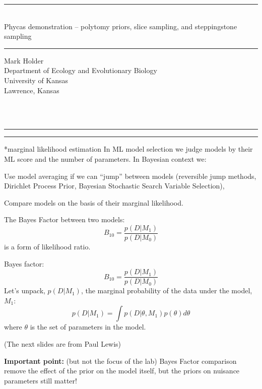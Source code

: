 \documentclass[landscape]{foils}
\newcommand{\section}{\secdef \newsection\newsection}
\newcommand{\newsection}[1]{%
{
	\par\flushleft\large\sf\bfseries \vskip -2cm #1\\\rule[0.7\baselineskip]{\textwidth}{0.5mm}\par}}
\newcommand{\myBackground}{\begin{picture}(0,0)(0,0)  \put(-40,-70){\makebox(0,0)[l]{\texttt{[image: images/baby\_blue.jpg]}}} \end{picture}}
\newcommand{\myFooter}{}
\newcommand{\myNewSlide}{\newpage\myFooter} %
\renewcommand{\Pr}{p}
\begin{document}
\pagecolor{white}
\MyLogo{}
\unitlength=1mm


\begin{flushleft}
\begin{center}
\rule{\textwidth}{2mm}\\
{\LARGE Phycas demonstration -- polytomy priors, slice sampling, and steppingstone sampling \\}
\vskip 2mm
\rule[2mm]{\textwidth}{2mm}
\end{center}
\vskip 2cm
Mark Holder\\
Department of Ecology and Evolutionary Biology\\
University of Kansas\\
Lawrence, Kansas

\end{flushleft}


\myNewSlide
\section*{marginal likelihood estimation}
In ML model selection we judge models by their ML score and the number of parameters.
In Bayesian context we:
\begin{compactitem}
	\item Use model averaging if we can ``jump'' between models (reversible jump methods, Dirichlet Process Prior, Bayesian Stochastic Search Variable Selection),
	\item Compare models on the basis of their marginal likelihood.
\end{compactitem}

The Bayes Factor between two models:
\[B_{10} = \frac{\Pr(D|M_1)}{\Pr(D|M_0)}\]
 is a form of likelihood ratio.\\
\myNewSlide

\myNewSlide
Bayes factor:
\[B_{10} = \frac{\Pr(D|M_1)}{\Pr(D|M_0)}\]
\vskip 2cm
Let's unpack, $\Pr(D|M_1)$, the marginal probability of the data under the model, $M_1$:
\[\Pr(D|M_1) = \int\Pr(D|\theta, M_1)\Pr(\theta)d\theta \]
where $\theta$ is the set of parameters in the model.


{\small (The next slides are from Paul Lewis)}

 

\myNewSlide
 

\myNewSlide
{\bf Important point:} (but not the focus of the lab) Bayes Factor comparison remove the effect of the prior on the model itself, but the priors on nuisance parameters still matter!
\end{document}

